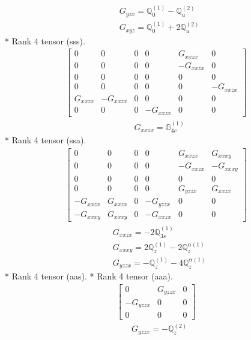 \documentclass[fleqn,8pt,landscape]{jsarticle}
\begin{document}
\begin{align*}
& G_{yzx} = \mathbb{Q}_{0}^{(1)} - \mathbb{Q}_{u}^{(2)} \\
& G_{xyz} = \mathbb{Q}_{0}^{(1)} + 2 \mathbb{Q}_{u}^{(2)}
\end{align*}
* Rank 4 tensor (sss).
\begin{align*}
\begin{bmatrix} 0 & 0 & 0 & 0 & G_{xxzx} & 0 \\ 0 & 0 & 0 & 0 & - G_{xxzx} & 0 \\ 0 & 0 & 0 & 0 & 0 & 0 \\ 0 & 0 & 0 & 0 & 0 & - G_{xxzx} \\ G_{xxzx} & - G_{xxzx} & 0 & 0 & 0 & 0 \\ 0 & 0 & 0 & - G_{xxzx} & 0 & 0 \end{bmatrix}
\end{align*}
\begin{align*}
& G_{xxzx} = \mathbb{G}_{4c}^{(1)}
\end{align*}
* Rank 4 tensor (ssa).
\begin{align*}
\begin{bmatrix} 0 & 0 & 0 & 0 & G_{xxzx} & G_{xxxy} \\ 0 & 0 & 0 & 0 & - G_{xxzx} & - G_{xxxy} \\ 0 & 0 & 0 & 0 & 0 & 0 \\ 0 & 0 & 0 & 0 & G_{yzzx} & G_{xxzx} \\ - G_{xxzx} & G_{xxzx} & 0 & - G_{yzzx} & 0 & 0 \\ - G_{xxxy} & G_{xxxy} & 0 & - G_{xxzx} & 0 & 0 \end{bmatrix}
\end{align*}
\begin{align*}
& G_{xxzx} = - 2 \mathbb{Q}_{3s}^{(1)} \\
& G_{xxxy} = 2 \mathbb{Q}_{z}^{(1)} - 2 \mathbb{Q}_{z}^{\alpha(1)} \\
& G_{yzzx} = - \mathbb{Q}_{z}^{(1)} - 4 \mathbb{Q}_{z}^{\alpha(1)}
\end{align*}
* Rank 4 tensor (aas).
* Rank 4 tensor (aaa).
\begin{align*}
\begin{bmatrix} 0 & G_{yzzx} & 0 \\ - G_{yzzx} & 0 & 0 \\ 0 & 0 & 0 \end{bmatrix}
\end{align*}
\begin{align*}
& G_{yzzx} = - \mathbb{Q}_{z}^{(2)}
\end{align*}
\end{document}
